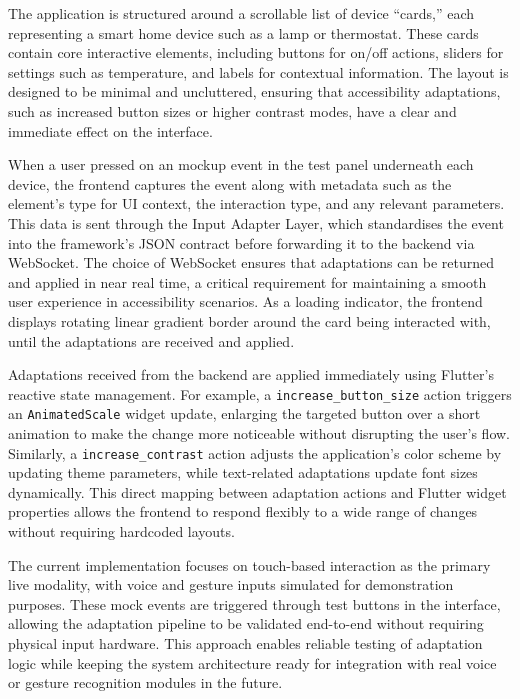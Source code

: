 \documentclass[openany]{book}
\begin{document}
The application is structured around a scrollable list of device “cards,” each representing a smart home device such as a lamp or thermostat. These cards contain core interactive elements, including buttons for on/off actions, sliders for settings such as temperature, and labels for contextual information. The layout is designed to be minimal and uncluttered, ensuring that accessibility adaptations, such as increased button sizes or higher contrast modes, have a clear and immediate effect on the interface.

When a user pressed on an mockup event in the test panel underneath each device, the frontend captures the event along with metadata such as the element’s type for UI context, the interaction type, and any relevant parameters. This data is sent through the Input Adapter Layer, which standardises the event into the framework’s JSON contract before forwarding it to the backend via WebSocket. The choice of WebSocket ensures that adaptations can be returned and applied in near real time, a critical requirement for maintaining a smooth user experience in accessibility scenarios.
As a loading indicator, the frontend displays rotating linear gradient border around the card being interacted with, until the adaptations are received and applied.

Adaptations received from the backend are applied immediately using Flutter’s reactive state management. For example, a \texttt{increase\_button\_size} action triggers an \texttt{AnimatedScale} widget update, enlarging the targeted button over a short animation to make the change more noticeable without disrupting the user’s flow. Similarly, a \texttt{increase\_contrast} action adjusts the application’s color scheme by updating theme parameters, while text-related adaptations update font sizes dynamically. This direct mapping between adaptation actions and Flutter widget properties allows the frontend to respond flexibly to a wide range of changes without requiring hardcoded layouts.

The current implementation focuses on touch-based interaction as the primary live modality, with voice and gesture inputs simulated for demonstration purposes. These mock events are triggered through test buttons in the interface, allowing the adaptation pipeline to be validated end-to-end without requiring physical input hardware. This approach enables reliable testing of adaptation logic while keeping the system architecture ready for integration with real voice or gesture recognition modules in the future.
\end{document}
